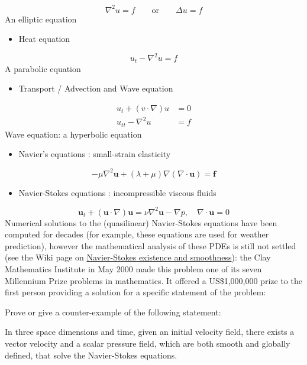 \documentclass[12pt,landscape]{article}
\begin{document}
{\begin{itemize}
\end{itemize}
\[
\nabla^2 u = f   \qquad \text{or} \qquad \Delta u = f
\]
An elliptic equation

\begin{itemize}
\item Heat equation

\end{itemize}
\[
 u_t - \nabla^2 u = f 
\]
A parabolic equation

\begin{itemize}
\item Transport / Advection and Wave equation 

\end{itemize}

\begin{align*}
    u_t + (v \cdot \nabla) u &= 0 \\
  u_{tt} - \nabla^2 u &= f 
\end{align*}
Wave equation: a hyperbolic equation

\begin{itemize}
\item Navier's equations : small-strain elasticity 

\end{itemize}
\[
- \mu \nabla^2 \mathbf{u} + (\lambda+\mu) \nabla  (\nabla\cdot\mathbf{u}) = \mathbf{f}
\]
\begin{itemize}
\item Navier-Stokes equations : incompressible viscous fluids 

\end{itemize}
\[
\mathbf{u}_t + (\mathbf{u} \cdot \nabla)\mathbf{u} = \nu \nabla^2 \mathbf{u} - \nabla p, \quad \nabla \cdot \mathbf{u} = 0
\]
Numerical solutions to the (quasilinear) Navier-Stokes equations have been computed for decades (for example, these equations are used for weather prediction), however the mathematical analysis of these PDEs is still not settled (see the Wiki page on \href{https://en.wikipedia.org/wiki/Navier%E2%80%93Stokes_existence_and_smoothness}{Navier-Stokes existence and smoothness}): the Clay Mathematics Institute in May 2000 made this problem one of its seven Millennium Prize problems in mathematics. It offered a US\$1,000,000 prize to the first person providing a solution for a specific statement of the problem:

Prove or give a counter-example of the following statement:

In three space dimensions and time, given an initial velocity field, there exists a vector velocity and a scalar pressure field, which are both smooth and globally defined, that solve the Navier-Stokes equations.

}
\end{document}
